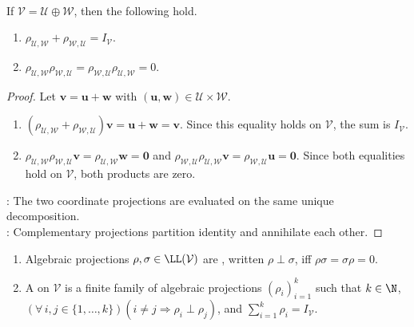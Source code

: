 \begin{proposition} \label{prop:complementary-algebraic-projections} \\
If $\mathcal{V}=\mathcal{U}\oplus\mathcal{W}$, then the following hold.
\begin{enumerate}[label=(\roman*)]
\setlength{\itemsep}{0pt}
\item $\rho_{\mathcal{U},\mathcal{W}}+\rho_{\mathcal{W},\mathcal{U}}=I_{\mathcal{V}}$.
\item $\rho_{\mathcal{U},\mathcal{W}}\rho_{\mathcal{W},\mathcal{U}}=\rho_{\mathcal{W},\mathcal{U}}\rho_{\mathcal{U},\mathcal{W}}=0$.
\end{enumerate}
\begin{proof}
Let $\mathbf{v}=\mathbf{u}+\mathbf{w}$ with $(\mathbf{u},\mathbf{w})\in\mathcal{U}\times\mathcal{W}$.
\begin{enumerate}[label=(\roman*)]
\setlength{\itemsep}{0pt}
\item $(\rho_{\mathcal{U},\mathcal{W}}+\rho_{\mathcal{W},\mathcal{U}})\mathbf{v}=\mathbf{u}+\mathbf{w}=\mathbf{v}$. Since this equality holds on $\mathcal{V}$, the sum is $I_{\mathcal{V}}$.
\item $\rho_{\mathcal{U},\mathcal{W}}\rho_{\mathcal{W},\mathcal{U}}\mathbf{v}=\rho_{\mathcal{U},\mathcal{W}}\mathbf{w}=\mathbf{0}$ and $\rho_{\mathcal{W},\mathcal{U}}\rho_{\mathcal{U},\mathcal{W}}\mathbf{v}=\rho_{\mathcal{W},\mathcal{U}}\mathbf{u}=\mathbf{0}$. Since both equalities hold on $\mathcal{V}$, both products are zero.
\end{enumerate}
: The two coordinate projections are evaluated on the same unique decomposition.\\
: Complementary projections partition identity and annihilate each other.
\end{proof}
\end{proposition}

\begin{definition} \label{def:algebraically-orthogonal-projections-and-resolutions} 
\begin{enumerate}[label=(\roman*)]
\setlength{\itemsep}{0pt}
\item Algebraic projections $\rho,\sigma\in\LL(\mathcal{V})$ are , written $\rho\perp\sigma$, iff $\rho\sigma=\sigma\rho=0$.
\item A  on $\mathcal{V}$ is a finite family of algebraic projections $(\rho_i)_{i=1}^{k}$ such that $k\in\N$,\\
$(\forall\,i,j\in\{1,\ldots,k\})(i\neq j\Rightarrow\rho_i\perp\rho_j)$, and $\sum\limits_{i=1}^{k}\rho_i=I_{\mathcal{V}}$.
\end{enumerate}
\end{definition}

